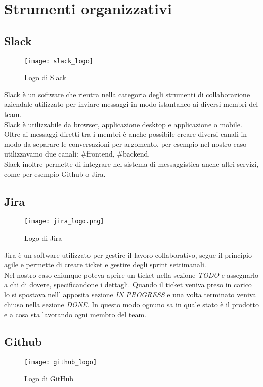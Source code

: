 \section{Strumenti organizzativi}

\subsection{Slack}
\begin{figure}[ht]
    \centering
    \texttt{[image: slack\_logo]}
    \caption{Logo di Slack}
\end{figure}

Slack è un software che rientra nella categoria degli strumenti di collaborazione aziendale utilizzato per inviare messaggi in modo istantaneo ai diversi membri del team.\\
Slack è utilizzabile da browser, applicazione desktop e applicazione o mobile.\\
Oltre ai messaggi diretti tra i membri è anche possibile creare diversi canali in modo da separare le conversazioni per argomento, per esempio nel nostro caso utilizzavamo due canali: \#frontend, \#backend.\\
Slack inoltre permette di integrare nel sistema di messaggistica anche altri servizi, come per esempio Github o Jira.

\subsection{Jira}
\begin{figure}[ht]
    \centering
    \texttt{[image: jira\_logo.png]}
    \caption{Logo di Jira}
\end{figure}

Jira è un software utilizzato per gestire il lavoro collaborativo, segue il principio agile e permette di creare ticket e gestire degli sprint settimanali.\\ Nel nostro caso chiunque poteva aprire un ticket nella sezione \textit{TODO} e assegnarlo a chi di dovere, specificandone i dettagli. Quando il ticket veniva preso in carico lo si spostava nell' apposita sezione \textit{IN PROGRESS} e una volta terminato veniva chiuso nella sezione \textit{DONE}. In questo modo ognuno sa in quale stato è il prodotto e a cosa sta lavorando ogni membro del team.


\subsection{Github}
\begin{figure}[ht]
    \centering
    \texttt{[image: github\_logo]}
    \caption{Logo di GitHub}
\end{figure}

